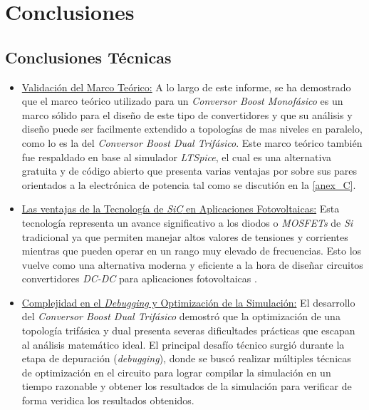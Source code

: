 \documentclass[12pt,a4paper]{article}
\begin{document}
\section{Conclusiones}                                                      \label{sec_3}
\subsection{Conclusiones Técnicas}                                          \label{sec_3.1}
\begin{itemize}
    \item \underline{Validación del Marco Teórico:} A lo largo de este informe, se ha demostrado que el marco teórico utilizado para un \textit{Conversor Boost Monofásico} es un marco sólido para el diseño de este tipo de convertidores y que su análisis y diseño puede ser facilmente extendido a topologías de mas niveles en paralelo, como lo es la del \textit{Conversor Boost Dual Trifásico}. Este marco teórico también fue respaldado en base al simulador \textit{LTSpice}, el cual es una alternativa gratuita y de código abierto que presenta varias ventajas por sobre sus pares orientados a la electrónica de potencia tal como se discutión en la \autoref{anex_C}.

    \item \underline{Las ventajas de la Tecnología de \textit{SiC} en Aplicaciones Fotovoltaicas:} Esta tecnología representa un avance significativo a los diodos o \textit{MOSFETs} de \textit{Si} tradicional ya que permiten manejar altos valores de tensiones y corrientes mientras que pueden operar en un rango muy elevado de frecuencias. Esto los vuelve como una alternativa moderna y eficiente a la hora de diseñar circuitos convertidores \textit{DC-DC} para aplicaciones fotovoltaicas \cite{b12}.
    
    
    \item \underline{Complejidad en el \textit{Debugging} y Optimización de la Simulación:} El desarrollo del \textit{Conversor Boost Dual Trifásico} demostró que la optimización de una topología trifásica y dual presenta severas dificultades prácticas que escapan al análisis matemático ideal. El principal desafío técnico surgió durante la etapa de depuración (\textit{debugging}), donde se buscó realizar múltiples técnicas de optimización en el circuito para lograr compilar la simulación en un tiempo razonable y obtener los resultados de la simulación para verificar de forma veridica los resultados obtenidos.
\end{itemize}
\end{document}
